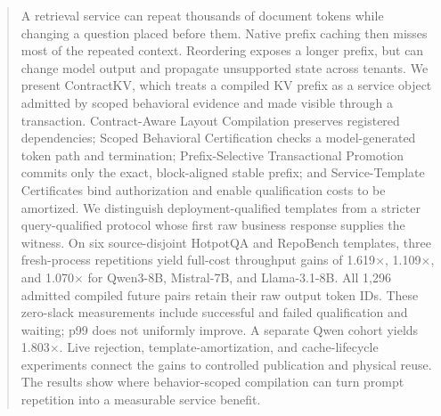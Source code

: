 \begin{abstract}
A retrieval service can repeat thousands of document tokens while changing a question placed before them. Native prefix caching then misses most of the repeated context. Reordering exposes a longer prefix, but can change model output and propagate unsupported state across tenants. We present ContractKV, which treats a compiled KV prefix as a service object admitted by scoped behavioral evidence and made visible through a transaction. Contract-Aware Layout Compilation preserves registered dependencies; Scoped Behavioral Certification checks a model-generated token path and termination; Prefix-Selective Transactional Promotion commits only the exact, block-aligned stable prefix; and Service-Template Certificates bind authorization and enable qualification costs to be amortized. We distinguish deployment-qualified templates from a stricter query-qualified protocol whose first raw business response supplies the witness. On six source-disjoint HotpotQA and RepoBench templates, three fresh-process repetitions yield full-cost throughput gains of 1.619$\times$, 1.109$\times$, and 1.070$\times$ for Qwen3-8B, Mistral-7B, and Llama-3.1-8B. All 1,296 admitted compiled future pairs retain their raw output token IDs. These zero-slack measurements include successful and failed qualification and waiting; p99 does not uniformly improve. A separate Qwen cohort yields 1.803$\times$. Live rejection, template-amortization, and cache-lifecycle experiments connect the gains to controlled publication and physical reuse. The results show where behavior-scoped compilation can turn prompt repetition into a measurable service benefit.
\end{abstract}
